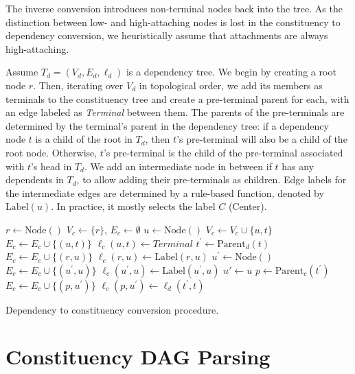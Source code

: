 \documentclass[11pt]{article}
\begin{document}
The inverse conversion introduces non-terminal nodes back into the tree.
As the distinction between low- and high-attaching nodes is lost in the constituency to
dependency conversion, we heuristically assume that attachments are always
high-attaching.

Assume $T_d=(V_d,E_d,\ell_d)$ is a dependency tree.
We begin by creating a root node $r$.
Then, iterating over $V_d$ in topological order,
we add its members as terminals to the constituency tree
and create a pre-terminal parent for each,
with an edge labeled as \textit{Terminal} between them.
The parents of the pre-terminals are determined by the terminal's parent in the dependency
tree: if a dependency node $t$ is a child of the root in $T_d$, then $t$'s pre-terminal will also be a child of the root node. Otherwise, $t$'s pre-terminal is the child of the pre-terminal associated with $t$'s head in $T_d$. We add an intermediate node in between if $t$ has any dependents in $T_d$,
to allow adding their pre-terminals as children.
Edge labels for the intermediate edges are determined by a rule-based function, denoted by $\mathrm{Label}(u)$.
In practice, it mostly selects the label $C$ (Center).

\begin{algorithm}
 $r \leftarrow \mathrm{Node()}$\;
 $V_c \leftarrow \{r\}$,
 $E_c \leftarrow \emptyset$\;
  {
  $u \leftarrow \mathrm{Node()}$\;
  $V_c \leftarrow V_c \cup \{u, t\}$\;
  $E_c \leftarrow E_c \cup \{(u, t)\}$\;
  $\ell_c(u,t)\leftarrow\mathit{Terminal}$\;
  $t^\prime \leftarrow \mathrm{Parent}_d(t)$\;
   {
   $E_c \leftarrow E_c \cup \{(r, u)\}$\;
   $\ell_c(r, u) \leftarrow \mathrm{Label}(r,u)$\;
  } {
    {
    $u^\prime \leftarrow \mathrm{Node()}$\;
    $E_c \leftarrow E_c \cup \{(u^\prime, u)\}$\;
    $\ell_c(u^\prime, u) \leftarrow \mathrm{Label}(u^\prime, u)$\;
   } {
    $u' \leftarrow u$\;
   }
   $p \leftarrow \mathrm{Parent}_c(t^\prime)$\;
   $E_c \leftarrow E_c \cup \{(p, u^\prime)\}$\;
   $\ell_c(p, u^\prime) \leftarrow \ell_d(t^\prime, t)$\;
  }
 }
 \caption{Dependency to constituency conversion procedure.}
 \label{alg:dep2con}
\end{algorithm}


\section{Constituency DAG Parsing}\label{sec:direct_approach}
\end{document}
